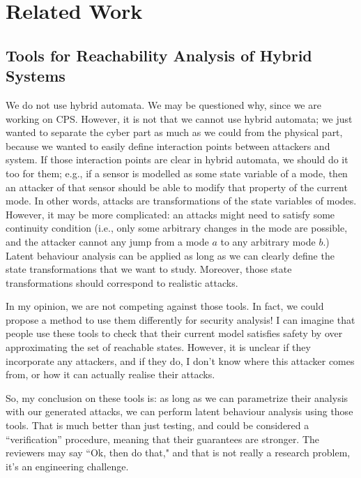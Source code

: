 {\section{Related Work}
{\color{blue}
\subsection{Tools for Reachability Analysis of Hybrid Systems}
We do not use hybrid automata. We may be questioned why, since we are working on CPS. However, it is not that we cannot use hybrid automata; we just wanted to separate the cyber part as much as we could from the physical part, because we wanted to easily define interaction points between attackers and system. If those interaction points are clear in hybrid automata, we should do it too for them; e.g., if a sensor is modelled as some state variable of a mode, then an attacker of that sensor should be able to modify that property of the current mode. In other words, attacks are transformations of the state variables of modes. However, it may be more complicated: an attacks might need to satisfy some continuity condition (i.e., only some arbitrary changes in the mode are possible, and the attacker cannot any jump from a mode $a$ to any arbitrary mode $b$.)
Latent behaviour analysis can be applied as long as we can clearly define the state transformations that we want to study. Moreover, those state transformations should correspond to realistic attacks.

In my opinion, we are not competing against those tools. In fact, we could propose a method to use them differently for security analysis! I can imagine that people use these tools to check that their current model satisfies safety by over approximating the set of reachable states. However, it is unclear if they incorporate any attackers, and if they do, I don't know where this attacker comes from, or how it can actually realise their attacks.

So, my conclusion on these tools is: as long as we can parametrize their analysis with our generated attacks, we can perform latent behaviour analysis using those tools. That is much better than just testing, and could be considered a ``verification'' procedure, meaning that their guarantees are stronger. The reviewers may say ``Ok, then do that," and that is not really a research problem, it's an engineering challenge.  
}

}
